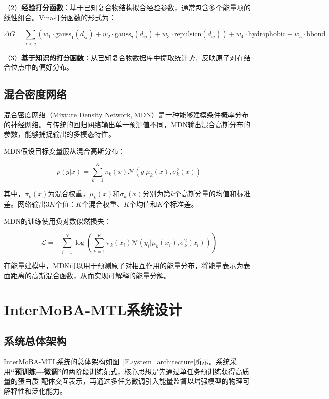 （2）\textbf{经验打分函数}：基于已知复合物结构拟合经验参数，通常包含多个能量项的线性组合。Vina打分函数的形式为：

\begin{equation}
\Delta G = \sum_{i<j}\left(w_1 \cdot \text{gauss}_1(d_{ij}) + w_2 \cdot \text{gauss}_2(d_{ij}) + w_3 \cdot \text{repulsion}(d_{ij})\right) + w_4 \cdot \text{hydrophobic} + w_5 \cdot \text{hbond}
\end{equation}

（3）\textbf{基于知识的打分函数}：从已知复合物数据库中提取统计势，反映原子对在结合位点中的偏好分布。

\subsection{混合密度网络}

混合密度网络（Mixture Density Network, MDN）是一种能够建模条件概率分布的神经网络。与传统的回归网络输出单一预测值不同，MDN输出混合高斯分布的参数，能够捕捉输出的多模态特性。

MDN假设目标变量服从混合高斯分布：

\begin{equation}
p(y|x) = \sum_{k=1}^{K} \pi_k(x) \mathcal{N}(y|\mu_k(x), \sigma_k^2(x))
\end{equation}

其中，$\pi_k(x)$为混合权重，$\mu_k(x)$和$\sigma_k(x)$分别为第$k$个高斯分量的均值和标准差。网络输出$3K$个值：$K$个混合权重、$K$个均值和$K$个标准差。

MDN的训练使用负对数似然损失：

\begin{equation}
\mathcal{L} = -\sum_{i=1}^{N} \log \left(\sum_{k=1}^{K} \pi_k(x_i) \mathcal{N}(y_i|\mu_k(x_i), \sigma_k^2(x_i))\right)
\end{equation}

在能量建模中，MDN可以用于预测原子对相互作用的能量分布，将能量表示为表面距离的高斯混合函数，从而实现可解释的能量分解。

\newpage

\section{InterMoBA-MTL系统设计}
\subsection{系统总体架构}

InterMoBA-MTL系统的总体架构如图~\ref{F.system_architecture}所示。系统采用\textbf{``预训练—微调''}的两阶段训练范式，核心思想是先通过单任务预训练获得高质量的蛋白质-配体交互表示，再通过多任务微调引入能量监督以增强模型的物理可解释性和泛化能力。

